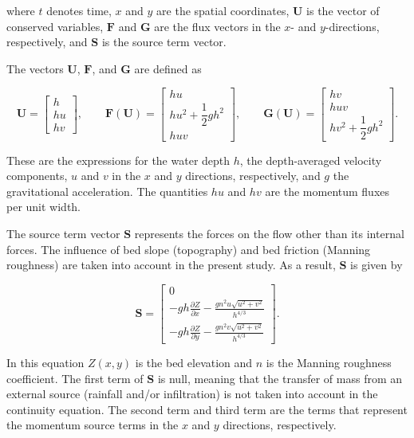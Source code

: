 \documentclass[12pt]{article}
\begin{document}
where $t$ denotes time, $x$ and $y$ are the spatial coordinates, $\mathbf{U}$ is the vector of conserved variables, $\mathbf{F}$ and $\mathbf{G}$ are the flux vectors in the $x$- and $y$-directions, respectively, and $\mathbf{S}$ is the source term vector.

The vectors $\mathbf{U}$, $\mathbf{F}$, and $\mathbf{G}$ are defined as

\begin{equation}
\mathbf{U}=
\begin{bmatrix}
h \\
hu \\
hv
\end{bmatrix},
\qquad
\mathbf{F}(\mathbf{U})=
\begin{bmatrix}
hu \\
hu^{2}+\dfrac{1}{2}gh^{2} \\
huv
\end{bmatrix},
\qquad
\mathbf{G}(\mathbf{U})=
\begin{bmatrix}
hv \\
huv \\
hv^{2}+\dfrac{1}{2}gh^{2}
\end{bmatrix}.
\label{eq:flux}
\end{equation}


These are the expressions for the water depth $h$, the depth-averaged velocity components, $u$ and $v$ in the $x$ and $y$ directions, respectively, and $g$ the gravitational acceleration. The quantities $hu$ and $hv$ are the momentum fluxes per unit width.

The source term vector $\mathbf{S}$ represents the forces on the flow other than its internal forces. The influence of bed slope (topography) and bed friction (Manning roughness) are taken into account in the present study. As a result, $\mathbf{S}$ is given by

\begin{equation}
\mathbf{S}=
\begin{bmatrix}
0 \\
-gh\displaystyle\frac{\partial Z}{\partial x}
-\displaystyle\frac{gn^{2}u\sqrt{u^{2}+v^{2}}}{h^{4/3}} \\
-gh\displaystyle\frac{\partial Z}{\partial y}
-\displaystyle\frac{gn^{2}v\sqrt{u^{2}+v^{2}}}{h^{4/3}}
\end{bmatrix}.
\label{eq:source}
\end{equation}

In this equation $Z(x,y)$ is the bed elevation and $n$ is the Manning roughness coefficient. The first term of $\mathbf{S}$ is null, meaning that the transfer of mass from an external source (rainfall and/or infiltration) is not taken into account in the continuity equation. The second term and third term are the terms that represent the momentum source terms in the $x$ and $y$ directions, respectively.
\end{document}
